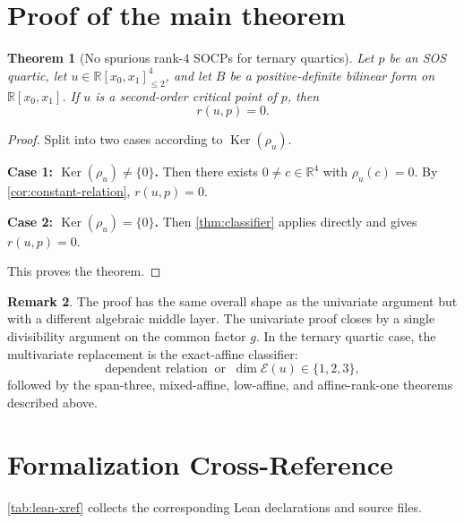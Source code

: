 \documentclass[10pt]{article}
\newtheorem{theorem}{Theorem}[section]
\theoremstyle{definition}
\newtheorem{remark}[theorem]{Remark}
\newcommand{\R}{\mathbb{R}}
\newcommand{\Poly}{\R[x_0,x_1]}
\newcommand{\Quad}{\Poly_{\le 2}}
\DeclareMathOperator{\kernel}{Ker}
\newcommand{\Ker}{\kernel}
\newcommand{\rel}{\rho}
\newcommand{\Exact}{\mathcal{E}}
\begin{document}
\section{Proof of the main theorem}\label{sec:main-proof}
\begin{theorem}[No spurious rank-$4$ SOCPs for ternary quartics]
\label{thm:main}
Let \(p\) be an SOS quartic, let \(u\in \Quad^4\), and let \(B\) be a
positive-definite bilinear form on \(\Poly\). If \(u\) is a second-order
critical point of \(p\), then
\[
  r(u,p)=0.
\]
\end{theorem}

\begin{proof}
Split into two cases according to \(\Ker(\rel_u)\).

\smallskip
\noindent\textbf{Case 1: \(\Ker(\rel_u)\neq \{0\}\).}
Then there exists \(0\neq c\in \R^4\) with \(\rel_u(c)=0\). By
\cref{cor:constant-relation}, \(r(u,p)=0\).

\smallskip
\noindent\textbf{Case 2: \(\Ker(\rel_u)=\{0\}\).}
Then \cref{thm:classifier} applies directly and gives \(r(u,p)=0\).

\smallskip
This proves the theorem.
\end{proof}

\begin{remark}\label{rem:structure}
The proof has the same overall shape as the univariate argument but with a
different algebraic middle layer. The univariate proof closes by a single
divisibility argument on the common factor \(g\). In the ternary quartic case,
the multivariate replacement is the exact-affine classifier:
\[
  \text{dependent relation}
  \;\;\text{or}\;\;
  \dim \Exact(u)\in \{1,2,3\},
\]
followed by the span-three, mixed-affine, low-affine, and affine-rank-one
theorems described above.
\end{remark}

\section{Formalization Cross-Reference}\label{sec:lean-xref}
\cref{tab:lean-xref} collects the corresponding Lean declarations and source
files.
\end{document}
